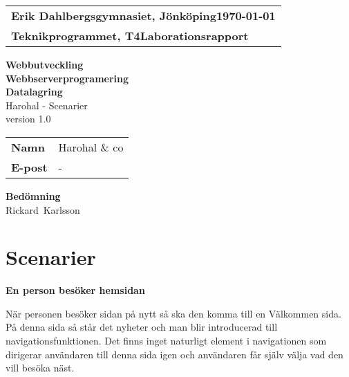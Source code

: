 \documentclass[11pt, titlepage, oneside, a4paper]{article}	%
\def\school{Erik Dahlbergsgymnasiet, Jönköping}				%
\def\class{T4}												%
\def\programme{Teknikprogrammet, \class}					%
\def\documenttype{Laborationsrapport}						%
\def\course{Webbutveckling\\ Webbserverprogramering\\Datalagring}	%
\def\title{Harohal - Scenarier}											%
\def\student{Harohal \& co}										%
\def\email{-}												%
\def\graders{Rickard Karlsson}								%
\begin{document}
\begin{titlepage}
	\thispagestyle{empty}
	\begin{normalsize}
		\begin{tabular}{@{}p{\textwidth}@{}}
			\textbf{\school \hfill \today} \\
			\textbf{\programme \hfill \documenttype} \\
		\end{tabular}
	\end{normalsize}
	\vspace{25mm}
	\begin{center}
		\huge{\textbf{\course}}\\
		\vspace{10mm}
		\LARGE{\title} \\
		\vspace{15mm}
        \LARGE{version 1.0} \\
        \vspace{10mm}
		\begin{large}
			\begin{tabular}{ll}
				\textbf{Namn} & \student \\
				\textbf{E-post} & \email \\
                
			\end{tabular}
		\end{large}
		\vfill
        \vfill
		\large{\textbf{Bedömning}}\\
		\mbox{\large{\graders}}
	\end{center}
\end{titlepage}
    
\lhead{\footnotesize\student, \today}
\rhead{\nouppercase{\footnotesize\leftmark}}
\pagestyle{fancy}
\renewcommand{\headrulewidth}{0.2pt} 

\newpage

\section*{Scenarier}
\textbf {En person besöker hemsidan }

När personen besöker sidan på nytt så ska den komma till en Välkommen sida. På denna sida så står det nyheter och man blir introducerad till navigationsfunktionen.  Det finns inget naturligt element i navigationen som dirigerar användaren till denna sida igen och användaren får själv välja vad den vill besöka näst.
\end{document}
